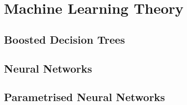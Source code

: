 \chapter{Machine Learning Theory}%
\label{sec:ml-theory}
\section{Boosted Decision Trees}%
\label{sec:bdts}
\section{Neural Networks}%
\label{sec:neural-networks}
\section{Parametrised Neural Networks}%
\label{sec:param-neural-nets}

